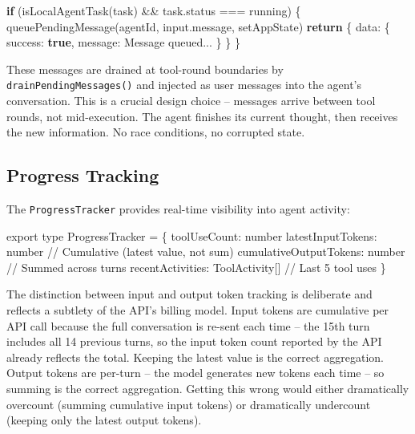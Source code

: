 \documentclass[
  english,
  11pt,
  letterpaper,
]{book}
\newenvironment{Shaded}{\begin{snugshade}}{\end{snugshade}}
\newcommand{\AttributeTok}[1]{\textcolor[rgb]{0.40,0.45,0.13}{#1}}
\newcommand{\CommentTok}[1]{\textcolor[rgb]{0.37,0.37,0.37}{#1}}
\newcommand{\ControlFlowTok}[1]{\textcolor[rgb]{0.00,0.23,0.31}{\textbf{#1}}}
\newcommand{\DataTypeTok}[1]{\textcolor[rgb]{0.68,0.00,0.00}{#1}}
\newcommand{\FunctionTok}[1]{\textcolor[rgb]{0.28,0.35,0.67}{#1}}
\newcommand{\ImportTok}[1]{\textcolor[rgb]{0.00,0.46,0.62}{#1}}
\newcommand{\KeywordTok}[1]{\textcolor[rgb]{0.00,0.23,0.31}{\textbf{#1}}}
\newcommand{\NormalTok}[1]{\textcolor[rgb]{0.00,0.23,0.31}{#1}}
\newcommand{\OperatorTok}[1]{\textcolor[rgb]{0.37,0.37,0.37}{#1}}
\newcommand{\StringTok}[1]{\textcolor[rgb]{0.13,0.47,0.30}{#1}}
\begin{document}
\begin{Shaded}
\begin{Highlighting}[]
\ControlFlowTok{if}\NormalTok{ (}\FunctionTok{isLocalAgentTask}\NormalTok{(task) }\OperatorTok{\&\&}\NormalTok{ task}\OperatorTok{.}\AttributeTok{status} \OperatorTok{===} \StringTok{\textquotesingle{}running\textquotesingle{}}\NormalTok{) \{}
  \FunctionTok{queuePendingMessage}\NormalTok{(agentId}\OperatorTok{,}\NormalTok{ input}\OperatorTok{.}\AttributeTok{message}\OperatorTok{,}\NormalTok{ setAppState)}
  \ControlFlowTok{return}\NormalTok{ \{ data}\OperatorTok{:}\NormalTok{ \{ success}\OperatorTok{:} \KeywordTok{true}\OperatorTok{,}\NormalTok{ message}\OperatorTok{:} \StringTok{\textquotesingle{}Message queued...\textquotesingle{}}\NormalTok{ \} \}}
\NormalTok{\}}
\end{Highlighting}
\end{Shaded}

These messages are drained at tool-round boundaries by
\texttt{drainPendingMessages()} and injected as user messages into the
agent's conversation. This is a crucial design choice -- messages arrive
between tool rounds, not mid-execution. The agent finishes its current
thought, then receives the new information. No race conditions, no
corrupted state.

\subsection{Progress Tracking}\label{progress-tracking}

The \texttt{ProgressTracker} provides real-time visibility into agent
activity:

\begin{Shaded}
\begin{Highlighting}[]
\ImportTok{export type}\NormalTok{ ProgressTracker }\OperatorTok{=}\NormalTok{ \{}
\NormalTok{  toolUseCount}\OperatorTok{:} \DataTypeTok{number}
\NormalTok{  latestInputTokens}\OperatorTok{:} \DataTypeTok{number}        \CommentTok{// Cumulative (latest value, not sum)}
\NormalTok{  cumulativeOutputTokens}\OperatorTok{:} \DataTypeTok{number}   \CommentTok{// Summed across turns}
\NormalTok{  recentActivities}\OperatorTok{:}\NormalTok{ ToolActivity[] }\CommentTok{// Last 5 tool uses}
\NormalTok{\}}
\end{Highlighting}
\end{Shaded}

The distinction between input and output token tracking is deliberate
and reflects a subtlety of the API's billing model. Input tokens are
cumulative per API call because the full conversation is re-sent each
time -- the 15th turn includes all 14 previous turns, so the input token
count reported by the API already reflects the total. Keeping the latest
value is the correct aggregation. Output tokens are per-turn -- the
model generates new tokens each time -- so summing is the correct
aggregation. Getting this wrong would either dramatically overcount
(summing cumulative input tokens) or dramatically undercount (keeping
only the latest output tokens).
\end{document}
